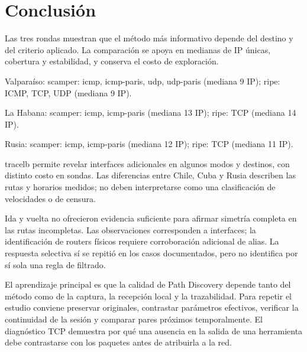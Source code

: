 \section{Conclusión}\label{sec:conclusion}
Las tres rondas muestran que el método más informativo depende del destino y del criterio aplicado. La comparación se apoya en medianas de IP únicas, cobertura y estabilidad, y conserva el costo de exploración.

Valparaíso: scamper: icmp, icmp-paris, udp, udp-paris (mediana 9 IP); ripe: ICMP, TCP, UDP (mediana 9 IP).

La Habana: scamper: icmp, icmp-paris (mediana 13 IP); ripe: TCP (mediana 14 IP).

Rusia: scamper: icmp, icmp-paris (mediana 12 IP); ripe: TCP (mediana 11 IP).

tracelb permite revelar interfaces adicionales en algunos modos y destinos, con distinto costo en sondas. Las diferencias entre Chile, Cuba y Rusia describen las rutas y horarios medidos; no deben interpretarse como una clasificación de velocidades o de censura.

Ida y vuelta no ofrecieron evidencia suficiente para afirmar simetría completa en las rutas incompletas. Las observaciones corresponden a interfaces; la identificación de routers físicos requiere corroboración adicional de alias. La respuesta selectiva sí se repitió en los casos documentados, pero no identifica por sí sola una regla de filtrado.

El aprendizaje principal es que la calidad de Path Discovery depende tanto del método como de la captura, la recepción local y la trazabilidad. Para repetir el estudio conviene preservar originales, contrastar parámetros efectivos, verificar la continuidad de la sesión y comparar pares próximos temporalmente. El diagnóstico TCP demuestra por qué una ausencia en la salida de una herramienta debe contrastarse con los paquetes antes de atribuirla a la red.

